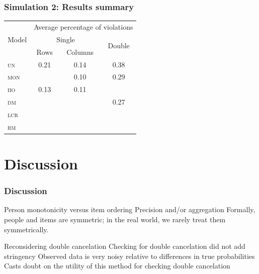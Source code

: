 \documentclass[10pt,serif,professionalfont]{beamer}
\begin{document}
\begin{frame}
    \frametitle{Simulation 2: Results summary}

    \begin{center}
    \begin{tabular}{lccc}
    \toprule
     \multirow{3}{*}{Model} & \multicolumn{3}{c}{Average percentage of violations} \\ \cmidrule(lr){2-4}
                & \multicolumn{2}{c}{Single} & \multirow{2}{*}{Double} \\ \cmidrule(lr){2-3}
                  & Rows       & Columns    &            \\

    \midrule
     \textsc{un}  & 0.21 & 0.14 & 0.38 \\
     \textsc{mon} & \color{gray}{0.16} & 0.10 & 0.29 \\
     \textsc{iio} & 0.13 & 0.11 & \color{gray}{0.29} \\
     \textsc{dm}  & \color{gray}{0.14} & \color{gray}{0.10} & 0.27 \\
     \textsc{lcr} & \color{gray}{0.10} & \color{gray}{0.07} & \color{gray}{0.21} \\
     \textsc{rm}  & \color{gray}{0.08} & \color{gray}{0.07} & \color{gray}{0.18} \\
    \bottomrule
    \end{tabular}
    \end{center}


\end{frame}

\section{Discussion}

\begin{frame}
    \frametitle{Discussion}

    \begin{outline}
        \1 Person monotonicity versus item ordering
            \2 Precision and/or aggregation
            \2 Formally, people and items are symmetric; in the real world, we rarely treat them symmetrically.

        \vspace{0.25cm}

        \1 Reconsidering double cancelation
            \2 Checking for double cancelation did not add stringency
            \2 Observed data is very noisy relative to differences in true probabilities
            \2 Casts doubt on the utility of this method for checking double cancelation

    \end{outline}

\end{frame}
\end{document}
